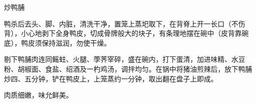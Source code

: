 \begin{recipe}{炒鸭脯}

\ingredients


\cooking

鸭杀后去头、脚、内脏，清洗干净，置笼上蒸圯取下，在背脊上开一长口（不伤背），小心地剥下全身鸭皮，切成骨牌般大的块子，有条理地摆在碗中（皮背靠碗底），鸭皮须保持滋润，勿使干燥。

剔下鸭脯肉连同鳐蛀、火腿、荸荠宰碎，盛在碗内，打下蛋清，加进味精、水豆粉、胡椒面、食盐、绍酒及一杓鸡汤，调拌均匀。在锅中将猪油煎辣后，放下鸭脯炒四、五分钟，铲在鸭皮上，上笼蒸约一分钟，取出翻在盘子上即成。

\notes

肉质细嫩，味允鲜美。

\end{recipe}

